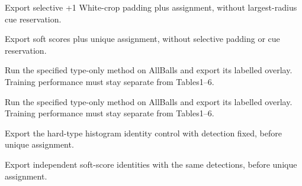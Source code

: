 \par\noindent\begin{minipage}{\linewidth}\small{}\par Export selective +1 White-crop padding plus assignment, without largest-radius cue reservation.
\end{minipage}\par\medskip
\par\noindent\begin{minipage}{\linewidth}\small{}\par Export soft scores plus unique assignment, without selective padding or cue reservation.
\end{minipage}\par\medskip
\par\noindent\begin{minipage}{\linewidth}\small{}\par Run the specified type-only method on AllBalls and export its labelled overlay. Training performance must stay separate from Tables1--6.
\end{minipage}\par\medskip
\par\noindent\begin{minipage}{\linewidth}\small{}\par Run the specified type-only method on AllBalls and export its labelled overlay. Training performance must stay separate from Tables1--6.
\end{minipage}\par\medskip
\par\noindent\begin{minipage}{\linewidth}\small{}\par Export the hard-type histogram identity control with detection fixed, before unique assignment.
\end{minipage}\par\medskip
\par\noindent\begin{minipage}{\linewidth}\small{}\par Export independent soft-score identities with the same detections, before unique assignment.
\end{minipage}\par\medskip
